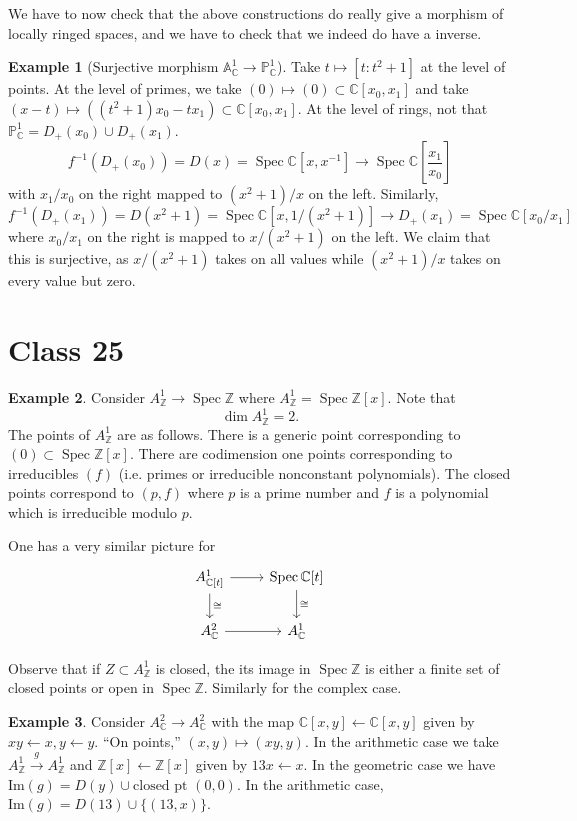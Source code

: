 \documentclass{article}
\newcommand{\Z}{\mathbb{Z}}
\newcommand{\C}{\mathbb{C}}
\newcommand{\Proj}{\mathbb{P}}
\DeclareMathOperator{\Spec}{Spec}
\theoremstyle{plain}
\theoremstyle{definition}
\newtheorem{exmp}{Example}
\theoremstyle{remark}
\begin{document}
We have to now check that the above constructions do really give a morphism of locally ringed spaces, and we have to check that we indeed do have a inverse.

\begin{exmp}[Surjective morphism $\mathbb{A}^1_\C\to\Proj_\C^1$]
Take $t\mapsto [t:t^2+1]$ at the level of points. At the level of primes, we take $(0)\mapsto (0)\subset\C[x_0,x_1]$ and take $(x-t)\mapsto ((t^2+1)x_0-tx_1)\subset\C[x_0,x_1]$. At the level of rings, not that $\Proj_\C^1=D_+(x_0)\cup D_+(x_1)$.
\[f^{-1}(D_+(x_0))=D(x)=\Spec\C[x,x^{-1}]\to\Spec \C[\frac{x_1}{x_0}]\]
with $x_1/x_0$ on the right mapped to $(x^2+1)/x$ on the left. Similarly,
\[f^{-1}(D_+(x_1))=D(x^2+1)=\Spec\C[x,1/(x^2+1)]\to D_+(x_1)=\Spec\C[x_0/x_1]\]
where $x_0/x_1$ on the right is mapped to $x/(x^2+1)$ on the left. We claim that this is surjective, as $x/(x^2+1)$ takes on all values while $(x^2+1)/x$ takes on every value but zero.
\end{exmp}

\section*{Class 25}

\begin{exmp}
Consider $A^1_\Z\to\Spec\Z$ where $A^1_\Z=\Spec\Z[x]$. Note that
\[\dim A^1_\Z=2.\]
The points of $A^1_\Z$ are as follows. There is a generic point corresponding to $(0)\subset \Spec \Z[x]$. There are codimension one points corresponding to irreducibles $(f)$ (i.e. primes or irreducible nonconstant polynomials). The closed points correspond to $(p, f)$ where $p$ is a prime number and $f$ is a polynomial which is irreducible modulo $p$.

One has a very similar picture for
\begin{equation*}
\begin{tikzcd}
A^1_{\C[t]}\arrow{r}\arrow{d}{\cong}&\Spec\C[t]\arrow{d}{\cong}\\
A^2_\C\arrow{r}&A_\C^1
\end{tikzcd}
\end{equation*}

Observe that if $Z\subset A^1_\Z$ is closed, the its image in $\Spec\Z$ is either a finite set of closed points or open in $\Spec \Z$. Similarly for the complex case.
\end{exmp}

\begin{exmp}
Consider $A^2_\C\to A^2_\C$ with the map $\C[x,y]\leftarrow\C[x,y]$ given by $xy\leftarrow x,y\leftarrow y$.
``On points,'' $(x,y)\mapsto (xy,y)$.
In the arithmetic case we take $A^1_\Z\overset{g}{\to} A^1_\Z$ and $\Z[x]\leftarrow\Z[x]$ given by $13x\leftarrow x$.
In the geometric case we have $\text{Im}(g)=D(y)\cup\text{closed pt }(0,0)$.
In the arithmetic case, $\text{Im}(g)=D(13)\cup\{(13,x)\}$.
\end{exmp}
\end{document}
